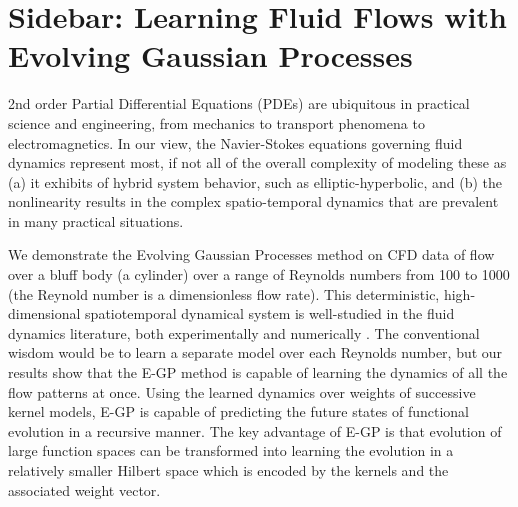 \documentclass[letterpaper,12pt,peerreviewca,draftcls]{IEEEtran}
\begin{document}
\processdelayedfloats






\clearpage
%

\section[Learning Fluid Flows with Evolving Gaussian Processes]{Sidebar: Learning Fluid Flows with Evolving Gaussian Processes}\label{sb:cfd}

2nd order Partial Differential Equations (PDEs) are ubiquitous in practical science and engineering, from mechanics to transport phenomena to electromagnetics. In our view, the Navier-Stokes equations governing fluid dynamics represent most, if not all of the overall complexity of modeling these as (a) it exhibits of hybrid system behavior, such as elliptic-hyperbolic, and (b) the nonlinearity results in the complex spatio-temporal dynamics that are prevalent in many practical situations. 

We demonstrate the Evolving Gaussian Processes method on CFD data of flow over a bluff body (a cylinder) over a range of Reynolds numbers from 100 to 1000 (the Reynold number is a dimensionless flow rate). This deterministic, high-dimensional spatiotemporal dynamical system is well-studied in the fluid dynamics literature, both experimentally and numerically \cite{roshko1954cylinder, braza1986cylinder, rajani1986cylinder}. The conventional wisdom would be to learn a separate model over each Reynolds number, but our results show that the E-GP method is capable of learning the dynamics of all the flow patterns at once. Using the learned dynamics over weights of successive kernel models, E-GP is capable of predicting the future states of functional evolution in a recursive manner. The key advantage of E-GP is that evolution of large function spaces can be transformed into learning the evolution in a relatively smaller Hilbert space which is encoded by the kernels and the associated weight vector. 
\end{document}
